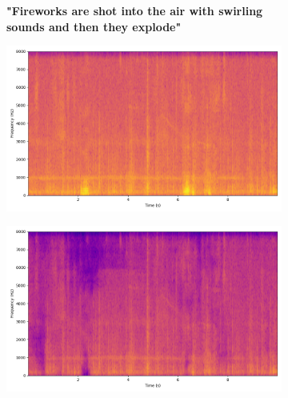 \begin{figure}[htbp]
     \begin{subfigure}[b]{0.185\textwidth}
        \centering
        \scriptsize\textbf{"Fireworks are shot into the air with swirling sounds and then they explode"}
        \vspace{5.0mm}
    \end{subfigure}
    \begin{subfigure}[b]{0.185\textwidth}
        \centering
        \includegraphics[width=\textwidth]{plots/onepeace_best_delta_similarity/onepeace mixture_spectrogram.png}
    \end{subfigure}
    \begin{subfigure}[b]{0.185\textwidth}
        \centering
        \includegraphics[width=\textwidth]{plots/onepeace_best_delta_similarity/onepeace sep_spectrogram.png}
    \end{subfigure}
    \begin{subfigure}[b]{0.185\textwidth}
        \centering

\end{subfigure}
\end{figure}
